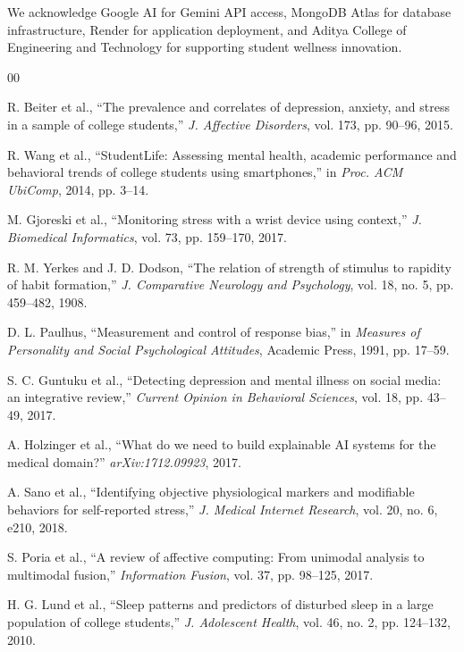 \documentclass[conference]{IEEEtran}
\begin{document}
We acknowledge Google AI for Gemini API access, MongoDB Atlas for database infrastructure, Render for application deployment, and Aditya College of Engineering and Technology for supporting student wellness innovation.

\begin{thebibliography}{00}

R. Beiter et al., ``The prevalence and correlates of depression, anxiety, and stress in a sample of college students,'' \textit{J. Affective Disorders}, vol. 173, pp. 90--96, 2015.

R. Wang et al., ``StudentLife: Assessing mental health, academic performance and behavioral trends of college students using smartphones,'' in \textit{Proc. ACM UbiComp}, 2014, pp. 3--14.

M. Gjoreski et al., ``Monitoring stress with a wrist device using context,'' \textit{J. Biomedical Informatics}, vol. 73, pp. 159--170, 2017.

R. M. Yerkes and J. D. Dodson, ``The relation of strength of stimulus to rapidity of habit formation,'' \textit{J. Comparative Neurology and Psychology}, vol. 18, no. 5, pp. 459--482, 1908.

D. L. Paulhus, ``Measurement and control of response bias,'' in \textit{Measures of Personality and Social Psychological Attitudes}, Academic Press, 1991, pp. 17--59.

S. C. Guntuku et al., ``Detecting depression and mental illness on social media: an integrative review,'' \textit{Current Opinion in Behavioral Sciences}, vol. 18, pp. 43--49, 2017.

A. Holzinger et al., ``What do we need to build explainable AI systems for the medical domain?'' \textit{arXiv:1712.09923}, 2017.

A. Sano et al., ``Identifying objective physiological markers and modifiable behaviors for self-reported stress,'' \textit{J. Medical Internet Research}, vol. 20, no. 6, e210, 2018.

S. Poria et al., ``A review of affective computing: From unimodal analysis to multimodal fusion,'' \textit{Information Fusion}, vol. 37, pp. 98--125, 2017.

H. G. Lund et al., ``Sleep patterns and predictors of disturbed sleep in a large population of college students,'' \textit{J. Adolescent Health}, vol. 46, no. 2, pp. 124--132, 2010.

\end{thebibliography}
\end{document}
